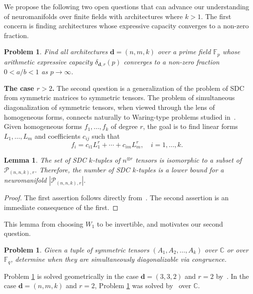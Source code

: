 \documentclass[a4paper]{cas-sc}
\newcommand{\dd}{\mathbf{d}}    %
\newcommand{\F}{\mathbb{F}}
\newtheorem{lemma}[theorem]{Lemma}
\newtheorem{problem}[theorem]{Problem}
\begin{document}
    We propose the following two open questions that can advance our understanding of neuromanifolds over finite fields with architectures where $k > 1$. The first concern is finding architectures whose expressive capacity converges to a non-zero fraction.
    \begin{problem} 
        Find all architectures $\dd=(n,m,k)$ over a prime field $\F_p$ whose arithmetic expressive capacity $\delta_{\dd,r}(p)$ converges to a non-zero fraction $0<a/b<1$ as $p \to \infty$.
    \end{problem}
    \textbf{The case $r>2$.}
    The second question is a generalization of the problem of SDC from symmetric matrices to symmetric tensors. The problem of simultaneous diagonalization of symmetric tensors, when viewed through the lens of homogeneous forms, connects naturally to Waring-type problems studied in~\citet{CARLINI2003}. Given homogeneous forms $f_1,\dots,f_k$ of degree $r$, the goal is to find linear forms $L_1,\dots,L_m$ and coefficients $c_{ij}$ such that
    \begin{equation}
    \label{eq: waring sim decomposition}
        f_i = c_{i1} L_1^r + \cdots + c_{im} L_m^r, \quad i = 1,\dots,k.
    \end{equation}
    
    \begin{lemma} 
    \label{lem: sdc tensors lower bound}
        The set of SDC $k$-tuples of $n^{\otimes r}$ tensors is isomorphic to a subset of $\mathcal{P}_{(n,n,k),r}$. Therefore, the number of SDC $k$-tuples is a lower bound for a neuromanifold $|\mathcal{P}_{(n,n,k),r}|$. 
    \end{lemma}
    \begin{proof}
        The first assertion follows directly from~. The second assertion is an immediate consequence of the first.
    \end{proof}
    This lemma from choosing $W_1$ to be invertible, and motivates our second question.
    \begin{problem}
    \label{prob: SDC over C or Fq}
        Given a tuple of symmetric tensors $(A_1,A_2,\dots,A_k)$ over $\mathbb{C}$ or over $\F_q$, determine when they are simultaneously diagonalizable via congruence.
    \end{problem}
    
    Problem \ref{prob: SDC over C or Fq} is solved geometrically in the case $\dd = (3,3,2)$ and $r=2$ by~\citet{KUSEJKO15}. In the case $\dd=(n,m,k)$ and $r=2$, Problem \ref{prob: SDC over C or Fq} was solved by~\citet{BUSTAMANTE20} over $\mathbb C$.
    
\end{document}
